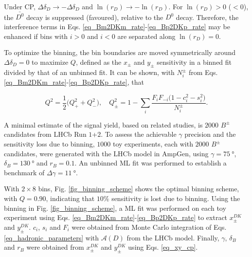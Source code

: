 \documentclass[12pt, a4paper, notitlepage, onecolumn]{article}
\begin{document}
Under CP, $\Delta\delta_D\to -\Delta\delta_D$ and $\ln(r_D)\to -\ln(r_D)$. For $\ln(r_D) > 0$ ($< 0$), the $\bar{D^0}$ decay is suppressed (favoured), relative to the $D^0$ decay. Therefore, the interference terms in Eqs. \eqref{eq_Bm2DKm_rate}-\eqref{eq_Bp2DKp_rate} may be enhanced if bins with $i > 0$ and $i < 0$ are separated along $\ln(r_D) = 0$.

To optimize the binning, the bin boundaries are moved symmetrically around $\Delta\delta_D = 0$ to maximize $Q$, defined as the $x_\pm$ and $y_\pm$ sensitivity in a binned fit divided by that of an unbinned fit. It can be shown, with $N_i^\pm$ from Eqs. \eqref{eq_Bm2DKm_rate}-\eqref{eq_Bp2DKp_rate}, that

\begin{equation*}
  Q^2 = \frac{1}{2}\big(Q^2_+ + Q^2_-\big), \quad Q^2_\pm = 1 - \sum_i\frac{F_iF_{-i}\big(1 - c_i^2 - s_i^2\big)}{N_i^\pm}.
\end{equation*}

A minimal estimate of the signal yield, based on related studies, is $2000$ $B^\pm$ candidates from LHCb Run $1$+$2$. To assess the achievable $\gamma$ precision and the sensitivity loss due to binning, $1000$ toy experiments, each with $2000$ $B^\pm$ candidates, were generated with the LHCb model in AmpGen, using $\gamma = \SI{75}{\degree}$, $\delta_B = \SI{130}{\degree}$ and $r_B = 0.1$. An unbinned ML fit was performed to establish a benchmark of $\Delta\gamma = \SI{11}{\degree}$.

With $2\times 8$ bins, Fig. \ref{fig_binning_scheme} shows the optimal binning scheme, with $Q = 0.90$, indicating that $10\%$ sensitivity is lost due to binning. Using the binning in Fig. \ref{fig_binning_scheme}, a ML fit was performed on each toy experiment using Eqs. \eqref{eq_Bm2DKm_rate}-\eqref{eq_Bp2DKp_rate} to extract $x_\pm^{DK}$ and $y_\pm^{DK}$. $c_i$, $s_i$ and $F_i$ were obtained from Monte Carlo integration of Eqs. \eqref{eq_hadronic_parameters} with $\mathcal{A}(D)$ from the LHCb model. Finally, $\gamma$, $\delta_B$ and $r_B$ were obtained from $x_\pm^{DK}$ and $y_\pm^{DK}$ using Eqs. \eqref{eq_xy_cp}.
\end{document}
